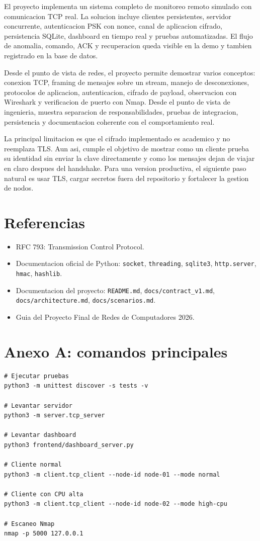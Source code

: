 \documentclass[11pt,letterpaper]{article}
\begin{document}
El proyecto implementa un sistema completo de monitoreo remoto simulado con
comunicacion TCP real. La solucion incluye clientes persistentes, servidor
concurrente, autenticacion PSK con nonce, canal de aplicacion cifrado,
persistencia SQLite, dashboard en tiempo real y pruebas automatizadas. El flujo
de anomalia, comando, ACK y recuperacion queda visible en la demo y tambien
registrado en la base de datos.

Desde el punto de vista de redes, el proyecto permite demostrar varios conceptos:
conexion TCP, framing de mensajes sobre un stream, manejo de desconexiones,
protocolos de aplicacion, autenticacion, cifrado de payload, observacion con
Wireshark y verificacion de puerto con Nmap. Desde el punto de vista de
ingenieria, muestra separacion de responsabilidades, pruebas de integracion,
persistencia y documentacion coherente con el comportamiento real.

La principal limitacion es que el cifrado implementado es academico y no reemplaza
TLS. Aun asi, cumple el objetivo de mostrar como un cliente prueba su identidad
sin enviar la clave directamente y como los mensajes dejan de viajar en claro
despues del handshake. Para una version productiva, el siguiente paso natural es
usar TLS, cargar secretos fuera del repositorio y fortalecer la gestion de nodos.

\newpage
\section{Referencias}

\begin{itemize}
  \item RFC 793: Transmission Control Protocol.
  \item Documentacion oficial de Python: \texttt{socket}, \texttt{threading}, \texttt{sqlite3}, \texttt{http.server}, \texttt{hmac}, \texttt{hashlib}.
  \item Documentacion del proyecto: \texttt{README.md}, \texttt{docs/contract\_v1.md}, \texttt{docs/architecture.md}, \texttt{docs/scenarios.md}.
  \item Guia del Proyecto Final de Redes de Computadores 2026.
\end{itemize}

\appendix
\newpage
\section{Anexo A: comandos principales}

\begin{lstlisting}[style=terminal]
# Ejecutar pruebas
python3 -m unittest discover -s tests -v

# Levantar servidor
python3 -m server.tcp_server

# Levantar dashboard
python3 frontend/dashboard_server.py

# Cliente normal
python3 -m client.tcp_client --node-id node-01 --mode normal

# Cliente con CPU alta
python3 -m client.tcp_client --node-id node-02 --mode high-cpu

# Escaneo Nmap
nmap -p 5000 127.0.0.1
\end{lstlisting}
\end{document}
